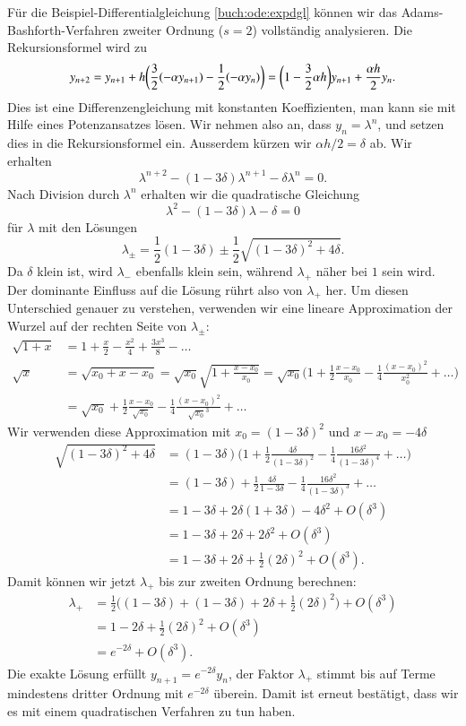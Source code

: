 Für die Beispiel-Differentialgleichung \eqref{buch:ode:expdgl} können
wir das Adams-Bashforth-Verfahren zweiter Ordnung ($s=2$) vollständig
analysieren.
Die Rekursionsformel wird zu
\[
y_{n+2}=y_{n+1}+h\biggl(\frac32 (-\alpha y_{n+1})-\frac12(-\alpha y_n)\biggr)
=
\biggl(1-\frac32\alpha h\biggr)
y_{n+1}
+\frac{\alpha h}{2}
y_{n\mathstrut}.
\]
Dies ist eine Differenzengleichung mit konstanten Koeffizienten, man kann
sie mit Hilfe eines Potenzansatzes lösen. 
Wir nehmen also an, dass $y_n=\lambda^n$, und setzen dies in die
Rekursionsformel ein.
Ausserdem kürzen wir $\alpha h/2=\delta$  ab.
Wir erhalten
\[
\lambda^{n+2}-(1-3\delta)\lambda^{n+1}-\delta\lambda^n=0.
\]
Nach Division durch $\lambda^n$ erhalten wir die quadratische Gleichung
\[
\lambda^2-(1-3\delta )\lambda-\delta=0
\]
für $\lambda$ mit den Lösungen
\[
\lambda_\pm
=
\frac12(1-3\delta) \pm \frac12\sqrt{(1-3\delta)^2+4\delta}.
\]
Da $\delta$ klein ist, wird $\lambda_-$ ebenfalls klein sein,
während $\lambda_+$ näher bei $1$ sein wird.
Der dominante Einfluss auf die Lösung rührt also von $\lambda_+$ her.
Um diesen Unterschied genauer zu verstehen, verwenden wir eine
lineare Approximation der Wurzel auf der rechten Seite von $\lambda_\pm$:
\begin{align*}
\sqrt{1+x}
&=
1+\frac{x}{2}-\frac{x^2}{4}+\frac{3x^3}{8}-\dots
\\
\sqrt{x}
&=
\sqrt{x_0+x-x_0}
=
\sqrt{x_0}\sqrt{1+\frac{x-x_0}{x_0}}
=
\sqrt{x_0}\biggl(1+\frac12\frac{x-x_0}{x_0}-\frac14\frac{(x-x_0)^2}{x_0^2}+\dots\biggr)
\\
&=
\sqrt{x_0}+\frac12\frac{x-x_0}{\sqrt{x_0}}-\frac14\frac{(x-x_0)^2}{\sqrt{x_0}^3}+\dots
\end{align*}
Wir verwenden diese Approximation mit $x_0=(1-3\delta)^2$ und $x-x_0=-4\delta$
\begin{align*}
\sqrt{(1-3\delta)^2+4\delta}
&=
(1-3\delta)\biggl(1+\frac12\frac{4\delta}{(1-3\delta)^2}
-\frac14\frac{16\delta^2}{(1-3\delta)^4}+\dots\biggr)
\\
&=(1-3\delta)+\frac12\frac{4\delta}{1-3\delta}
-\frac14\frac{16\delta^2}{(1-3\delta)^3}+\dots
\\
&=1-3\delta+2\delta(1+3\delta)-4\delta^2+O(\delta^3)
\\
&=1-3\delta+2\delta + 2\delta^2+O(\delta^3)
\\
&=1-3\delta+2\delta + \frac12(2\delta)^2+O(\delta^3).
\end{align*}
Damit können wir jetzt $\lambda_+$ bis zur zweiten Ordnung berechnen:
\begin{align*}
\lambda_+
&=
\frac12\biggl((1-3\delta)+ (1-3\delta)+2\delta+\frac12(2\delta)^2\biggr)
+O(\delta^3)
\\
&=
1-2\delta+\frac12(2\delta)^2+O(\delta^3)
\\
&=e^{-2\delta}+O(\delta^3).
\end{align*}
Die exakte Lösung erfüllt $y_{n+1}=e^{-2\delta}y_n$, der Faktor
$\lambda_+$ stimmt bis auf Terme mindestens dritter Ordnung mit 
$e^{-2\delta}$ überein.
Damit ist erneut bestätigt, dass wir es mit einem quadratischen Verfahren zu
tun haben.

